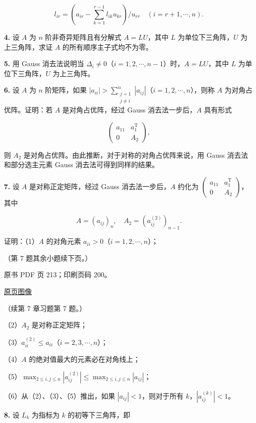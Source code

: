 \[
l_{ir}=\left(a_{ir}-\sum_{k=1}^{r-1}l_{ik}u_{kr}\right)/u_{rr}\quad(i=r+1,\cdots,n).
\]

\textbf{4.} 设 \(A\) 为 \(n\) 阶非奇异矩阵且有分解式 \(A=LU\)，其中 \(L\) 为单位下三角阵，\(U\) 为上三角阵，求证 \(A\) 的所有顺序主子式均不为零。

\textbf{5.} 用 Gauss 消去法说明当 \(\Delta_i\neq0\)（\(i=1,2,\cdots,n-1\)）时，\(A=LU\)，其中 \(L\) 为单位下三角阵，\(U\) 为上三角阵。

\textbf{6.} 设 \(A\) 为 \(n\) 阶矩阵，如果 \(|a_{ii}|>\sum_{\substack{j=1\\j\neq i}}^{n}|a_{ij}|\)（\(i=1,2,\cdots,n\)），则称 \(A\) 为对角占优阵。证明：若 \(A\) 是对角占优阵，经过 Gauss 消去法一步后，\(A\) 具有形式

\[
\begin{pmatrix}a_{11}&a_1^{\mathrm T}\\0&A_2\end{pmatrix},
\]

则 \(A_2\) 是对角占优阵。由此推断，对于对称的对角占优阵来说，用 Gauss 消去法和部分选主元素 Gauss 消去法可得到同样的结果。

\textbf{7.} 设 \(A\) 是对称正定矩阵，经过 Gauss 消去法一步后，\(A\) 约化为 \(\begin{pmatrix}a_{11}&a_1^{\mathrm T}\\0&A_2\end{pmatrix}\)，其中

\[
A=(a_{ij})_n,\quad A_2=(a_{ij}^{(2)})_{n-1}.
\]

证明：（1）\(A\) 的对角元素 \(a_{ii}>0\)（\(i=1,2,\cdots,n\)）；

（第 7 题其余小题续下页。）

\clearpage

原书 PDF 页 213；印刷页码 200。

\href{source-images/pdf-213.jpeg}{原页图像}

（续第 7 章习题第 7 题。）

（2）\(A_2\) 是对称正定矩阵；

（3）\(a_{ii}^{(2)}\leqslant a_{ii}\)（\(i=2,3,\cdots,n\)）；

（4）\(A\) 的绝对值最大的元素必在对角线上；

（5）\(\max_{2\leqslant i,j\leqslant n}|a_{ij}^{(2)}|\leqslant\max_{2\leqslant i,j\leqslant n}|a_{ij}|\)；

（6）从（2）、（3）、（5）推出，如果 \(|a_{ij}|<1\)，则对于所有 \(k\)，\(|a_{ij}^{(k)}|<1\)。

\textbf{8.} 设 \(L_k\) 为指标为 \(k\) 的初等下三角阵，即

